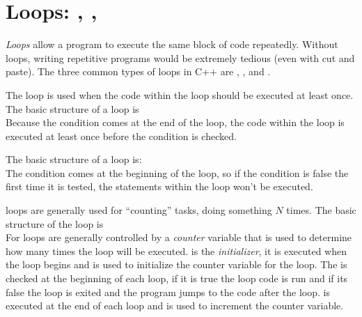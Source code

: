 \section{Loops: , , }\label{appendix:loops}

\emph{Loops} allow a program to execute the same block of code repeatedly.  Without loops, writing repetitive programs would be extremely tedious (even with cut and paste).  The three common types of loops in C++ are  , , and .  

The  loop is used when the code within the loop should be executed at least once.    The basic structure of a   loop is\\
Because the condition comes at the end of the loop, the code within the loop is executed at least once before the condition is checked.  
 
The basic structure of a   loop is:\\
The condition comes at the beginning of the loop, so if the condition is false the first time it is tested, the statements within the loop won't be executed.

 loops are generally used for ``counting'' tasks, doing something $N$ times.  The basic structure of the  loop is\\
For loops are generally controlled by a \emph{counter} variable that is used to determine how many times the loop will be executed.
 is the \emph{initializer}, it is executed when the loop begins and is used to initialize the counter variable for the loop.  The  is checked at the beginning of each loop, if it is true the loop code is run and if its false the loop is exited and the program jumps to the code after the loop.  is executed at the end of each loop and is used to increment the counter variable.  

